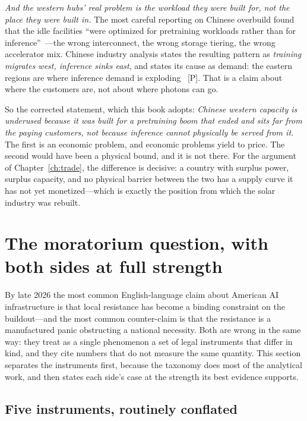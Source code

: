 \emph{And the western hubs' real problem is the workload they were built for, not the place they were built in.} The most careful reporting on Chinese overbuild found that the idle facilities ``were optimized for pretraining workloads rather than for inference''~\cite{china-idle}---the wrong interconnect, the wrong storage tiering, the wrong accelerator mix. Chinese industry analysis states the resulting pattern as \emph{training migrates west, inference sinks east}, and states its cause as demand: the eastern regions are where inference demand is exploding~\cite{sina-inference} [P]. That is a claim about where the customers are, not about where photons can go.

So the corrected statement, which this book adopts: \emph{Chinese western capacity is underused because it was built for a pretraining boom that ended and sits far from the paying customers, not because inference cannot physically be served from it.} The first is an economic problem, and economic problems yield to price. The second would have been a physical bound, and it is not there. For the argument of Chapter~\ref{ch:trade}, the difference is decisive: a country with surplus power, surplus capacity, and no physical barrier between the two has a supply curve it has not yet monetized---which is exactly the position from which the solar industry was rebuilt.

\section{The moratorium question, with both sides at full strength}
\label{sec:moratorium}

By late 2026 the most common English-language claim about American AI infrastructure is that local resistance has become a binding constraint on the buildout---and the most common counter-claim is that the resistance is a manufactured panic obstructing a national necessity. Both are wrong in the same way: they treat as a single phenomenon a set of legal instruments that differ in kind, and they cite numbers that do not measure the same quantity. This section separates the instruments first, because the taxonomy does most of the analytical work, and then states each side's case at the strength its best evidence supports.

\subsection{Five instruments, routinely conflated}

